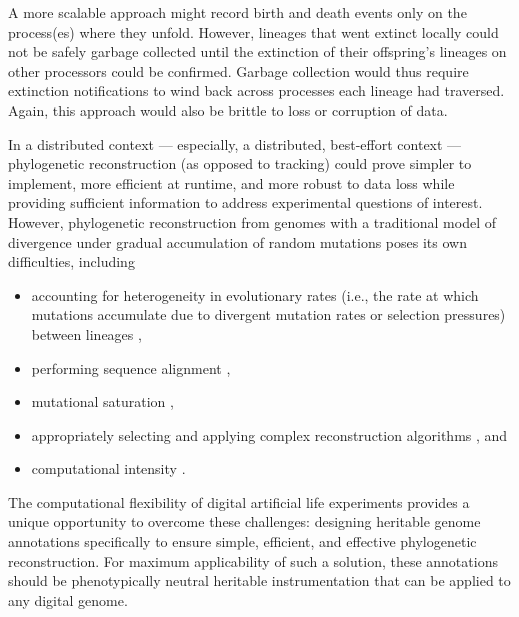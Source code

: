 A more scalable approach might record birth and death events only on the process(es) where they unfold.
However, lineages that went extinct locally could not be safely garbage collected until the extinction of their offspring's lineages on other processors could be confirmed.
Garbage collection would thus require extinction notifications to wind back across processes each lineage had traversed.
Again, this approach would also be brittle to loss or corruption of data.


In a distributed context --- especially, a distributed, best-effort context --- phylogenetic reconstruction (as opposed to tracking) could prove simpler to implement, more efficient at runtime, and more robust to data loss while providing sufficient information to address experimental questions of interest.
However, phylogenetic reconstruction from genomes with a traditional model of divergence under gradual accumulation of random mutations poses its own difficulties, including
\begin{itemize}
\item accounting for heterogeneity in evolutionary rates (i.e., the rate at which mutations accumulate due to divergent mutation rates or selection pressures) between lineages \citep{lack2010identifying},
\item performing sequence alignment \citep{casci2008lining},
\item mutational saturation \citep{hagstrom2004using},
\item appropriately selecting and applying complex reconstruction algorithms \citep{kapli2020phylogenetic}, and
\item computational intensity \citep{sarkar2010hardware}.
\end{itemize}

The computational flexibility of digital artificial life experiments provides a unique opportunity to overcome these challenges: designing heritable genome annotations specifically to ensure simple, efficient, and effective phylogenetic reconstruction.
For maximum applicability of such a solution, these annotations should be phenotypically neutral heritable instrumentation \citep{stanley2002evolving} that can be applied to any digital genome.

